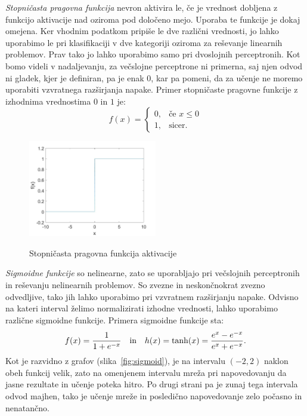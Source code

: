 \documentclass[mat1]{fmfdelo}
\begin{document}
\emph{Stopničasta pragovna funkcija} nevron aktivira le, če je vrednost dobljena z funkcijo aktivacije nad oziroma pod določeno mejo. Uporaba te funkcije je dokaj omejena. Ker vhodnim podatkom pripiše le dve različni vrednosti, jo lahko uporabimo le pri klasifikaciji v dve kategoriji oziroma za reševanje linearnih problemov. Prav tako jo lahko uporabimo samo pri dvoslojnih perceptronih. Kot bomo videli v nadaljevanju, za večslojne perceptrone ni primerna, saj njen odvod ni gladek, kjer je definiran, pa je enak $0$, kar pa pomeni, da za učenje ne moremo uporabiti vzvratnega razširjanja napake. Primer stopničaste pragovne funkcije z izhodnima vrednostima $0$ in $1$ je:
%
\begin{equation*}
f(x)=
    \begin{cases}
      0, & \text{če } x  \leq 0 \\
      1, & \text{sicer.}
    \end{cases} 
\end{equation*}
%
\begin{figure}[!ht]
  \centering
    \includegraphics[width=0.5\textwidth]{step_fun.jpg}
  \label{fig:step}
 \caption{Stopničasta pragovna funkcija aktivacije}
\end{figure}

\emph{Sigmoidne funkcije} so nelinearne, zato se uporabljajo pri večslojnih perceptronih in reševanju nelinearnih problemov. So zvezne in neskončnokrat zvezno odvedljive, tako jih lahko uporabimo pri vzvratnem razširjanju napake. Odvisno na kateri interval želimo normalizirati izhodne vrednosti, lahko uporabimo različne sigmoidne funkcije. Primera sigmoidne funkcije sta: 
%
\begin{equation}
f(x) = \frac{1}{1+e^{-x}} \quad \text{in} \quad h(x) = \tanh(x) = \frac{e^x-e^{-x}}{e^x+e^{-x}} \text.
\end{equation}
%
Kot je razvidno z grafov (slika~\ref{fig:sigmoid}), je na intervalu $(-2,2)$ naklon obeh funkcij velik, zato na omenjenem intervalu mreža pri napovedovanju da jasne rezultate in učenje poteka hitro. Po drugi strani pa je zunaj tega intervala odvod majhen, tako je učenje mreže in posledično napovedovanje zelo počasno in nenatančno. 
\end{document}
